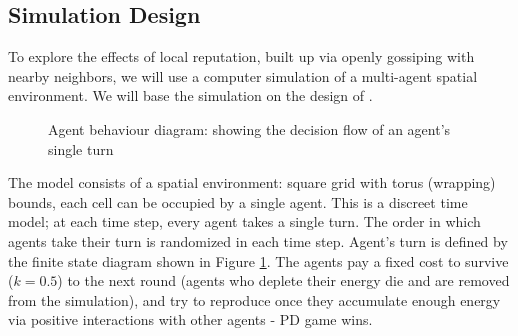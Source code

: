 \documentclass[english]{article}
\begin{document}
\subsection{Simulation Design}

To explore the effects of local reputation, built up via openly gossiping with nearby neighbors,
we will use a computer simulation of a multi-agent spatial environment.
We will base the simulation on the design of \citet{smaldino}.

\begin{figure}[h]
  \centering
  \caption{Agent behaviour diagram: showing the decision flow of an agent's single turn}
  \label{fig:agent_behaviour}
\end{figure}

The model consists of a spatial environment:
square grid with torus (wrapping) bounds,
each cell can be occupied by a single agent.
This is a discreet time model;
at each time step, every agent takes a single turn.
The order in which agents take their turn is randomized in each time step.
Agent's turn is defined by the finite state diagram shown in Figure \ref{fig:agent_behaviour}.
The agents pay a fixed cost to survive ($k = 0.5$) to the next round (agents who deplete their energy die and are removed from the simulation), and try to reproduce once they accumulate enough energy via positive interactions with other agents - PD game wins.
\end{document}
